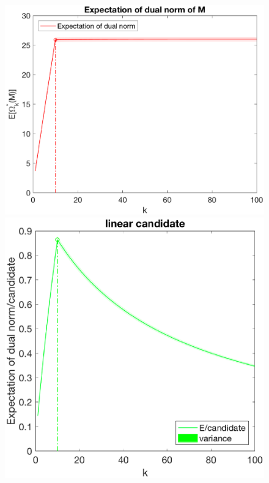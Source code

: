 \documentclass[12pt]{article}
\begin{document}
\begin{figure}[h]
    \begin{minipage}[c]{.3\linewidth}
        \centering
        \includegraphics[width=\linewidth]{Fig/dualnorm-u0ones-k0-10.eps}
    \end{minipage}
    \hfill%
    \begin{minipage}[c]{.3\linewidth}
        \centering
        \includegraphics[width=\linewidth]{Fig/dualnorm-u0ones-k0-10-candidatelin.eps}

\end{minipage}
\end{figure}
\end{document}
